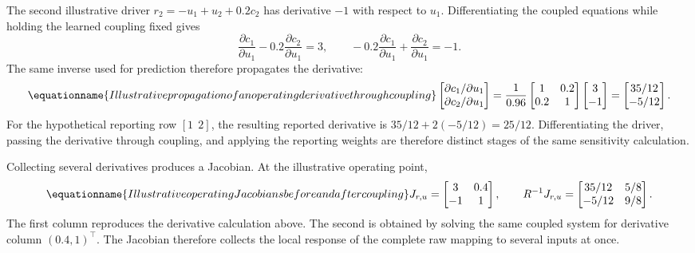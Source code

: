 The second illustrative driver \(r_2=-u_1+u_2+0.2c_2\) has derivative \(-1\) with respect to \(u_1\). Differentiating the coupled equations while holding the learned coupling fixed gives
\[
\frac{\partial c_1}{\partial u_1}-0.2\frac{\partial c_2}{\partial u_1}=3,
\qquad
-0.2\frac{\partial c_1}{\partial u_1}+\frac{\partial c_2}{\partial u_1}=-1.
\]
The same inverse used for prediction therefore propagates the derivative:
\begin{equation}
\equationname{Illustrative propagation of an operating derivative through coupling}
\label{eq:icsor_small_chain_derivative}
\begin{bmatrix}\partial c_1/\partial u_1\\\partial c_2/\partial u_1\end{bmatrix}
=\frac{1}{0.96}\begin{bmatrix}1&0.2\\0.2&1\end{bmatrix}
\begin{bmatrix}3\\-1\end{bmatrix}
=\begin{bmatrix}35/12\\-5/12\end{bmatrix}.
\end{equation}
For the hypothetical reporting row \([1\ \ 2]\), the resulting reported derivative is \(35/12+2(-5/12)=25/12\). Differentiating the driver, passing the derivative through coupling, and applying the reporting weights are therefore distinct stages of the same sensitivity calculation.

Collecting several derivatives produces a Jacobian. At the illustrative operating point,
\begin{equation}
\equationname{Illustrative operating Jacobians before and after coupling}
\label{eq:icsor_small_operating_jacobian}
J_{r,u}=\begin{bmatrix}3&0.4\\-1&1\end{bmatrix},
\qquad
R^{-1}J_{r,u}=\begin{bmatrix}35/12&5/8\\-5/12&9/8\end{bmatrix}.
\end{equation}
The first column reproduces the derivative calculation above. The second is obtained by solving the same coupled system for derivative column \((0.4,1)^\top\). The Jacobian therefore collects the local response of the complete raw mapping to several inputs at once.


